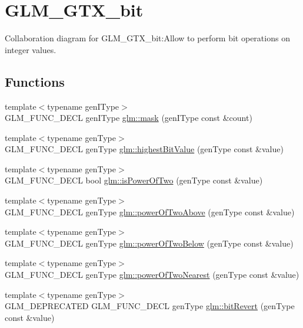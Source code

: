 \hypertarget{group__gtx__bit}{
\section{GLM\_\-GTX\_\-bit}
\label{group__gtx__bit}
}


Collaboration diagram for GLM\_\-GTX\_\-bit:Allow to perform bit operations on integer values.  
\subsection*{Functions}
\begin{CompactItemize}
\item 
{\footnotesize template$<$typename genIType$>$ }\\GLM\_\-FUNC\_\-DECL genIType \hyperlink{group__gtx__bit_g7a909d8e8b8a5f73ed643bdca7602017}{glm::mask} (genIType const \&count)
\item 
{\footnotesize template$<$typename genType$>$ }\\GLM\_\-FUNC\_\-DECL genType \hyperlink{group__gtx__bit_gda4310fc2dd8db30392da133067ed13e}{glm::highestBitValue} (genType const \&value)
\item 
{\footnotesize template$<$typename genType$>$ }\\GLM\_\-FUNC\_\-DECL bool \hyperlink{group__gtx__bit_g2b12722968dabd423334391d1fd42acd}{glm::isPowerOfTwo} (genType const \&value)
\item 
{\footnotesize template$<$typename genType$>$ }\\GLM\_\-FUNC\_\-DECL genType \hyperlink{group__gtx__bit_gf27d271ec57b96b6acae9395b9c4a365}{glm::powerOfTwoAbove} (genType const \&value)
\item 
{\footnotesize template$<$typename genType$>$ }\\GLM\_\-FUNC\_\-DECL genType \hyperlink{group__gtx__bit_ga0bb1687b43f594a471c5506cc505dce}{glm::powerOfTwoBelow} (genType const \&value)
\item 
{\footnotesize template$<$typename genType$>$ }\\GLM\_\-FUNC\_\-DECL genType \hyperlink{group__gtx__bit_g0e3c8f921e59dc07ad9c70bb1376799c}{glm::powerOfTwoNearest} (genType const \&value)
\item 
{\footnotesize template$<$typename genType$>$ }\\GLM\_\-DEPRECATED GLM\_\-FUNC\_\-DECL genType \hyperlink{group__gtx__bit_g878bcf889f80259fcf86d0e25db92af4}{glm::bitRevert} (genType const \&value)
\item 

\end{CompactItemize}
